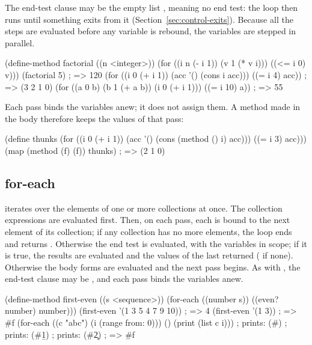 \noindent The end-test clause may be the empty list \code{()}, meaning no
end test: the loop then runs until something exits from it
(Section~\ref{sec:control-exits}). Because all the steps are evaluated before any
variable is rebound, the variables are stepped in parallel.

\begin{dylan}
(define-method factorial ((n <integer>))
  (for ((i n (- i 1))
        (v 1 (* v i)))
       ((<= i 0) v)))
(factorial 5)            ; => 120
(for ((i 0 (+ i 1))
      (acc '() (cons i acc)))
     ((= i 4) acc))      ; => (3 2 1 0)
(for ((a 0 b) (b 1 (+ a b)) (i 0 (+ i 1)))
     ((= i 10) a))       ; => 55
\end{dylan}

\noindent Each pass binds the variables anew; it does not assign them. A
method made in the body therefore keeps the values of that pass:

\begin{dylan}
(define thunks
  (for ((i 0 (+ i 1))
        (acc '() (cons (method () i) acc)))
       ((= i 3) acc)))
(map (method (f) (f)) thunks)   ; => (2 1 0)
\end{dylan}

\subsection{for-each}

\begin{quote}
\end{quote}

\noindent {} iterates over the elements of one or more
collections at once. The collection expressions are evaluated first. Then,
on each pass, each  is bound to the next element of its
collection; if any collection has no more elements, the loop ends and
returns . Otherwise the end test is evaluated, with the variables
in scope; if it is true, the results are evaluated and the values of the
last returned ( if none). Otherwise the body forms are evaluated
and the next pass begins. As with , the end-test clause may be
\code{()}, and each pass binds the variables anew.

\begin{dylan}
(define-method first-even ((s <sequence>))
  (for-each ((number s))
            ((even? number) number)))
(first-even '(1 3 5 4 7 9 10))   ; => 4
(first-even '(1 3))              ; => #f
(for-each ((c "abc")
           (i (range from: 0)))
          ()
  (print (list c i)))            ; prints: (#)
                                 ; prints: (#\b 1)
                                 ; prints: (#\c 2)
                                 ; => #f
\end{dylan}


